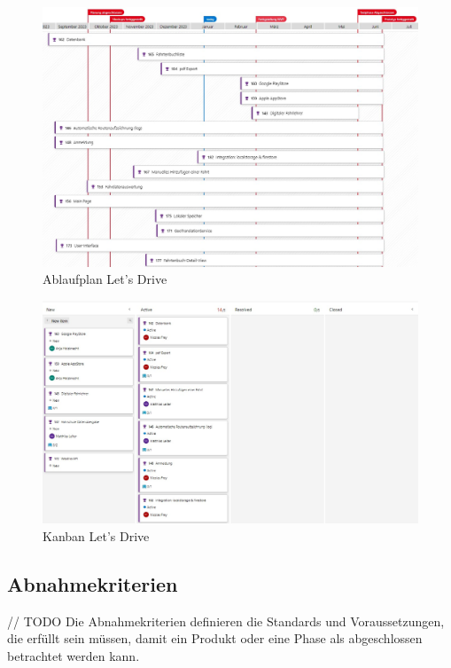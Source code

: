 \begin{figure}[H]
	\centering
	\includegraphics[width=\textwidth,height=\textheight,keepaspectratio]{figures/deliveryplan.jpg}
	\caption{Ablaufplan Let's Drive}
	\label{fig:ablaufplan}
\end{figure}

\begin{figure}[H]
	\centering
	\includegraphics[width=\textwidth,height=\textheight,keepaspectratio]{figures/kanban.jpg}
	\caption{Kanban Let's Drive}
	\label{fig:kanban}
\end{figure}

 

\subsection{Abnahmekriterien}
// TODO
Die Abnahmekriterien definieren die Standards und Voraussetzungen, die erfüllt sein müssen, damit ein Produkt oder eine Phase als abgeschlossen betrachtet werden kann.

